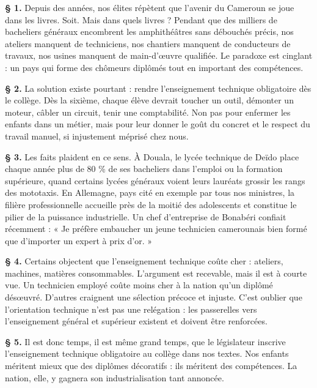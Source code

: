 \documentclass[11pt]{article}
\begin{document}
\begin{exemplebox}
\textbf{§ 1.} Depuis des années, nos élites répètent que l'avenir du Cameroun se joue dans les livres. Soit. Mais dans quels livres ? Pendant que des milliers de bacheliers généraux encombrent les amphithéâtres sans débouchés précis, nos ateliers manquent de techniciens, nos chantiers manquent de conducteurs de travaux, nos usines manquent de main-d'œuvre qualifiée. Le paradoxe est cinglant : un pays qui forme des chômeurs diplômés tout en important des compétences.

\textbf{§ 2.} La solution existe pourtant : rendre l'enseignement technique obligatoire dès le collège. Dès la sixième, chaque élève devrait toucher un outil, démonter un moteur, câbler un circuit, tenir une comptabilité. Non pas pour enfermer les enfants dans un métier, mais pour leur donner le goût du concret et le respect du travail manuel, si injustement méprisé chez nous.

\textbf{§ 3.} Les faits plaident en ce sens. À Douala, le lycée technique de Deïdo place chaque année plus de 80 \% de ses bacheliers dans l'emploi ou la formation supérieure, quand certains lycées généraux voient leurs lauréats grossir les rangs des mototaxis. En Allemagne, pays cité en exemple par tous nos ministres, la filière professionnelle accueille près de la moitié des adolescents et constitue le pilier de la puissance industrielle. Un chef d'entreprise de Bonabéri confiait récemment : « Je préfère embaucher un jeune technicien camerounais bien formé que d'importer un expert à prix d'or. »

\textbf{§ 4.} Certains objectent que l'enseignement technique coûte cher : ateliers, machines, matières consommables. L'argument est recevable, mais il est à courte vue. Un technicien employé coûte moins cher à la nation qu'un diplômé désœuvré. D'autres craignent une sélection précoce et injuste. C'est oublier que l'orientation technique n'est pas une relégation : les passerelles vers l'enseignement général et supérieur existent et doivent être renforcées.

\textbf{§ 5.} Il est donc temps, il est même grand temps, que le législateur inscrive l'enseignement technique obligatoire au collège dans nos textes. Nos enfants méritent mieux que des diplômes décoratifs : ils méritent des compétences. La nation, elle, y gagnera son industrialisation tant annoncée.
\end{exemplebox}
\end{document}
